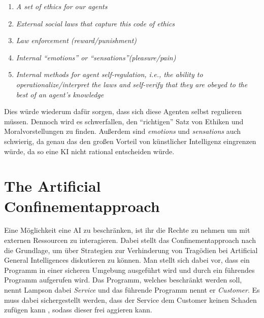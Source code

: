         \begin{enumerate}
            \item \textit{A set of ethics for our agents}
            \item \textit{External social laws that capture this code of ethics}
            \item \textit{Law enforcement (reward/punishment)}
            \item \textit{Internal ``emotions'' or ``sensations''(pleasure/pain)}
            \item \textit{Internal methods for agent self-regulation, i.e., the ability to operationalize/interpret the laws
            and self-verify that they are obeyed to the best of an agent's knowledge}
        \end{enumerate}
        \cite{GordonSpears2003}
        Dies würde wiederum dafür sorgen, dass sich diese Agenten selbst regulieren müssen. Dennoch wird es schwerfallen,
        den ``richtigen'' Satz von Ethiken und Moralvorstellungen zu finden. Außerdem sind \textit{emotions} und
        \textit{sensations} auch schwierig, da genau das den großen Vorteil von künstlicher Intelligenz eingrenzen würde,
        da so eine KI nicht rational entscheiden würde.

    \section{The Artificial Confinementapproach}

        Eine Möglichkeit eine AI zu beschränken, ist ihr die Rechte zu nehmen um mit externen Ressourcen zu interagieren.
        Dabei stellt das Confinementapproach nach \cite{lampson1973note} die Grundlage, um über Strategien zur Verhinderung
        von Tragödien bei Artificial General Intelligences diskutieren zu können. Man stellt sich dabei vor, dass ein
        Programm in einer sicheren Umgebung ausgeführt wird und durch ein führendes Programm aufgerufen wird. Das Programm,
        welches beschränkt werden soll, nennt Lampson dabei \textit{Service} und das führende Programm nennt er
        \textit{Customer}. Es muss dabei sichergestellt werden, dass der Service dem Customer keinen Schaden zufügen kann
        \cite{lampson1973note}, sodass dieser frei aggieren kann.

